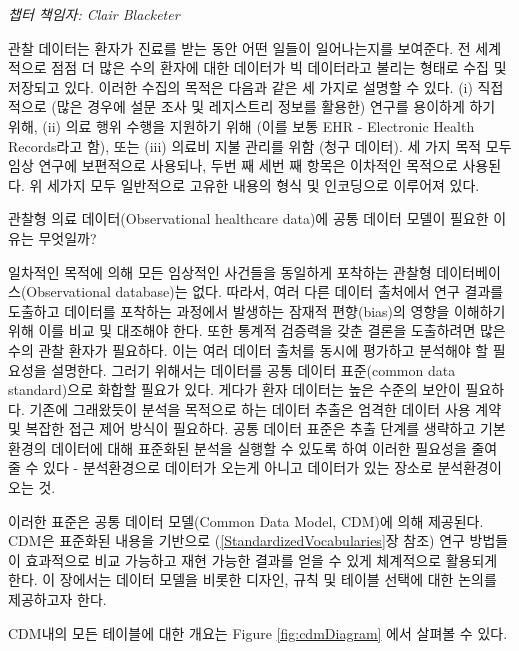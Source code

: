 \documentclass[11pt]{book}
\theoremstyle{definition}
\theoremstyle{definition}
\theoremstyle{definition}
\theoremstyle{remark}
\begin{document}
\emph{챕터 책임자: Clair Blacketer}

관찰 데이터는 환자가 진료를 받는 동안 어떤 일들이 일어나는지를 보여준다.
전 세계적으로 점점 더 많은 수의 환자에 대한 데이터가 빅 데이터라고
불리는 형태로 수집 및 저장되고 있다. 이러한 수집의 목적은 다음과 같은 세
가지로 설명할 수 있다. (i) 직접적으로 (많은 경우에 설문 조사 및
레지스트리 정보를 활용한) 연구를 용이하게 하기 위해, (ii) 의료 행위
수행을 지원하기 위해 (이를 보통 EHR - Electronic Health Records라고 함),
또는 (iii) 의료비 지불 관리를 위함 (청구 데이터). 세 가지 목적 모두 임상
연구에 보편적으로 사용되나, 두번 째 세번 째 항목은 이차적인 목적으로
사용된다. 위 세가지 모두 일반적으로 고유한 내용의 형식 및 인코딩으로
이루어져 있다. 

관찰형 의료 데이터(Observational healthcare data)에 공통 데이터 모델이
필요한 이유는 무엇일까?

일차적인 목적에 의해 모든 임상적인 사건들을 동일하게 포착하는 관찰형
데이터베이스(Observational database)는 없다. 따라서, 여러 다른 데이터
출처에서 연구 결과를 도출하고 데이터를 포착하는 과정에서 발생하는 잠재적
편향(bias)의 영향을 이해하기 위해 이를 비교 및 대조해야 한다. 또한
통계적 검증력을 갖춘 결론을 도출하려면 많은 수의 관찰 환자가 필요하다.
이는 여러 데이터 출처를 동시에 평가하고 분석해야 할 필요성을 설명한다.
그러기 위해서는 데이터를 공통 데이터 표준(common data standard)으로
화합할 필요가 있다. 게다가 환자 데이터는 높은 수준의 보안이 필요하다.
기존에 그래왔듯이 분석을 목적으로 하는 데이터 추출은 엄격한 데이터 사용
계약 및 복잡한 접근 제어 방식이 필요하다. 공통 데이터 표준은 추출 단계를
생략하고 기본 환경의 데이터에 대해 표준화된 분석을 실행할 수 있도록 하여
이러한 필요성을 줄여 줄 수 있다 - 분석환경으로 데이터가 오는게 아니고
데이터가 있는 장소로 분석환경이 오는 것.

이러한 표준은 공통 데이터 모델(Common Data Model, CDM)에 의해 제공된다.
CDM은 표준화된 내용을 기반으로 (\ref{StandardizedVocabularies}장 참조)
연구 방법들이 효과적으로 비교 가능하고 재현 가능한 결과를 얻을 수 있게
체계적으로 활용되게 한다. 이 장에서는 데이터 모델을 비롯한 디자인, 규칙
및 테이블 선택에 대한 논의를 제공하고자 한다.

CDM내의 모든 테이블에 대한 개요는 Figure \ref{fig:cdmDiagram}
에서 살펴볼 수 있다.
\end{document}
